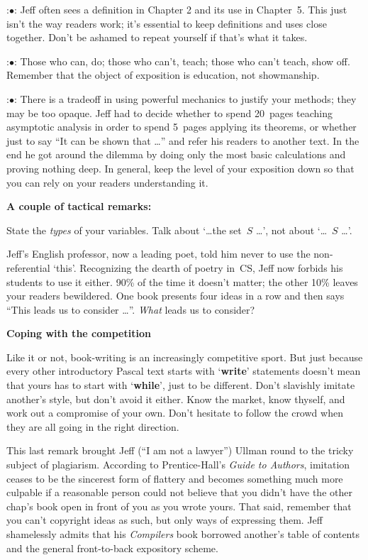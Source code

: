 \display 20pt:$\bullet$:
Jeff often sees a definition in Chapter 2 and its use in Chapter~5.
This just isn't the way readers work; it's essential to keep
definitions and uses close together. Don't be ashamed to repeat
yourself if that's what it takes.

\display 20pt:$\bullet$:
Those who can, do; those who can't, teach; those who can't teach,
show off.  Remember that the object of exposition is education, not
showmanship.

\display 20pt:$\bullet$:
There is a tradeoff in using powerful mechanics to justify your
methods; they may be too opaque. Jeff had to decide whether to spend
20~pages teaching asymptotic analysis in order to spend 5~pages
applying its theorems, or whether just to say ``It can be shown that
\dots'' and refer his readers to another text. In the end he got around
the dilemma by doing only the most basic calculations and proving
nothing deep. In general, keep the level of your exposition down so
that you can rely on your readers understanding it.

\smallskip
{\bf A couple of tactical remarks:}

State the {\it types\/} of your variables. Talk about `\dots  the set~$S$
\dots', not about `\dots ~$S$ \dots'. 

Jeff's English professor, now a leading poet, told him never to use the
non-referential `this'. Recognizing the dearth of poetry in~CS, Jeff
now forbids his students to use it either. 90\% of the time it doesn't
matter; the other 10\% leaves your readers bewildered. One book
presents four ideas in a row and then says ``This leads us to
consider \dots''.  {\it What\/} leads us to consider?

\vfill\eject

{\bf Coping with the competition}

Like it or not, book-writing is an increasingly competitive sport.
But just because every other introductory Pascal text starts with
`{\bf write}' statements doesn't mean that yours has to start with `{\bf while}',
just to be different.  Don't slavishly imitate another's style, but
don't avoid it either. Know the market, know thyself, and work out a
compromise of your own. Don't hesitate to follow the crowd when they
are all going in the right direction.

This last remark brought Jeff (``I am not a lawyer'') Ullman round to
the tricky subject of plagiarism. According to Prentice-Hall's
{\sl Guide to Authors},
imitation ceases to be the sincerest form of flattery and becomes
something much more culpable if a reasonable person could not believe
that you didn't have the other chap's book open in front of you as you
wrote yours. That said, remember that you can't copyright ideas as such, but
only ways of expressing them. Jeff shamelessly admits that his {\sl
Compilers\/} book borrowed another's table of contents  and the
general front-to-back expository scheme.

